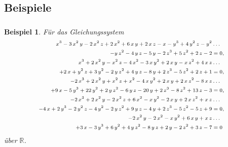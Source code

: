 \documentclass[11pt]{beamer}
\newcommand{\R}{{\mathbb R}}
\theoremstyle{custom}
\theoremstyle{custom}
\newtheorem{exm}{Beispiel}[section]
\begin{document}
	\subsection*{Beispiele}
	\begin{frame}
		\frametitle{}
		\begin{exm}
			Für das Gleichungssystem
		\begin{equation*}\label{eqn:example5C3_1}
			\scriptsize
			\begin{alignedat}{1}
				x^3-3\,x^2\,y-2\,x^2\,z+2\,x^2+6\,x\,y+2\,x\,z-x-y^3+4\,y^2\,z-y^2&\ldots\\
				-y\,z^2-4\,y\,z-5\,y-2\,z^3+5\,z^2+2\,z-2&=0,\\ x^3+2\,x^2\,y-x^2\,z-4\,x^2-3\,x\,y^2+2\,x\,y-x\,z^2+4\,x\,z&\ldots\\
				+2\,x+y^2\,z+3\,y^2-2\,y\,z^2+4\,y\,z-8\,y+2\,z^3-5\,z^2+2\,z+1&=0,\\ -2\,x^3+2\,x^2\,y+x^2\,z+x^2-4\,x\,y^2+2\,x\,y+2\,x\,z^2-8\,x\,z&\ldots\\
				+9\,x-5\,y^3+22\,y^2+2\,y\,z^2-6\,y\,z-20\,y+2\,z^3-8\,z^2+13\,z-3&=0,\\ -2\,x^3+2\,x^2\,y-2\,x^2\,z+6\,x^2-x\,y^2-2\,x\,y+2\,x\,z^2+x\,z&\ldots\\
				-4\,x+2\,y^3-2\,y^2\,z-4\,y^2-2\,y\,z^2+9\,y\,z-4\,y+2\,z^3-5\,z^2-5\,z+9&=0,\\ -2\,x^2\,y-2\,x^2-x\,y^2+6\,x\,y+x\,z&\ldots\\
				+3\,x-3\,y^3+6\,y^2+4\,y\,z^2-8\,y\,z+2\,y-2\,z^2+3\,z-7&=0
			\end{alignedat}
		\end{equation*}
		über $\R$.
		\end{exm}
	\end{frame}
\end{document}
